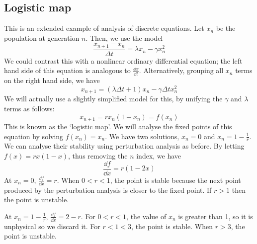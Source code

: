 \subsection{Logistic map}
This is an extended example of analysis of discrete equations.
Let \(x_n\) be the population at generation \(n\).
Then, we use the model
\[
	\frac{x_{n+1} - x_n}{\Delta t} = \lambda x_n - \gamma x_n^2
\]
We could contrast this with a nonlinear ordinary differential equation; the left hand side of this equation is analogous to \(\frac{\dd{x}}{\dd{t}}\).
Alternatively, grouping all \(x_n\) terms on the right hand side, we have
\[
	x_{n+1} = (\lambda \Delta t + 1)x_n - \gamma \Delta t x_n^2
\]
We will actually use a slightly simplified model for this, by unifying the \(\gamma\) and \(\lambda\) terms as follows:
\[
	x_{n+1} = r x_n (1 - x_n) = f(x_n)
\]
This is known as the `logistic map'.
We will analyse the fixed points of this equation by solving \(f(x_n) = x_n\).
We have two solutions, \(x_n = 0\) and \(x_n = 1 - \frac{1}{r}\).
We can analyse their stability using perturbation analysis as before.
By letting \(f(x) = rx(1-x)\), thus removing the \(n\) index, we have
\[
	\frac{\dd{f}}{\dd{x}} = r(1-2x)
\]
At \(x_n = 0\), \(\frac{\dd{f}}{\dd{x}} = r\).
When \(0 < r < 1\), the point is stable because the next point produced by the perturbation analysis is closer to the fixed point.
If \(r > 1\) then the point is unstable.

At \(x_n = 1 - \frac{1}{r}\), \(\frac{\dd{f}}{\dd{x}} = 2 - r\).
For \(0 < r < 1\), the value of \(x_n\) is greater than 1, so it is unphysical so we discard it.
For \(r < 1 < 3\), the point is stable.
When \(r > 3\), the point is unstable.
